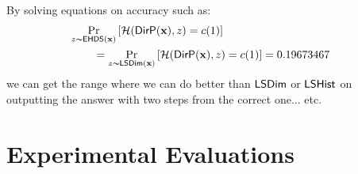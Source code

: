 \documentclass{article}
\begin{document}
By solving equations on accuracy such as:
\begin{align*}
\lefteqn{\hexpmechPr{\dataobs}{\hellinger(\bysinfer{\dataobs}, z) = c(1)  }}\\
&\qquad =
\lapmechPr{\dataobs}{\hellinger(\bysinfer{\dataobs}, z) = c(1)  }
=
0.19673467 
\end{align*}
we can get the range where we can do better than $\mathsf{LSDim}$ or $\mathsf{LSHist}$ on outputting the answer with two steps from the correct one... etc.


\section{Experimental Evaluations}
\label{sec_experiment}
\end{document}
